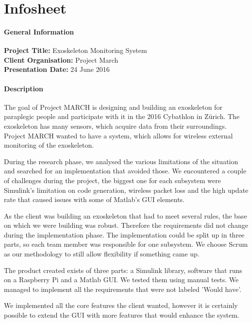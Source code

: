 \chapter{Infosheet}
\pagebreak
\begin{small}
\subsubsection{General Information}
{\bfseries Project Title:} Exoskeleton Monitoring System\\
{\bfseries Client Organisation:} Project March\\
{\bfseries Presentation Date:} 24 June 2016

\subsubsection{Description}
The goal of Project MARCH is designing and building an exoskeleton for paraplegic people and participate with it in the 2016 Cybathlon in Zürich. The exoskeleton has many sensors, which acquire data from their surroundings. Project MARCH wanted to have a system, which allows for wireless external monitoring of the exoskeleton. 

During the research phase, we analysed the various limitations of the situation and searched for an implementation that avoided those. We encountered a couple of challenges during the project, the biggest one for each subsystem were Simulink's limitation on code generation, wireless packet loss and the high update rate that caused issues with some of Matlab's GUI elements.  

As the client was building an exoskeleton that had to meet several rules, the base on which we were building was robust. Therefore the requirements did not change during the implementation phase. The implementation could be split up in three parts, so each team member was responsible for one subsystem. We choose Scrum as our methodology to still allow flexibility if something came up.

The product created exists of three parts: a Simulink library, software that runs on a Raspberry Pi and a Matlab GUI. We tested them using manual tests. We managed to implement all the requirements that were not labeled 'Would have'. 

We implemented all the core features the client wanted, however it is certainly possible to extend the GUI with more features that would enhance the system.


\end{small}
